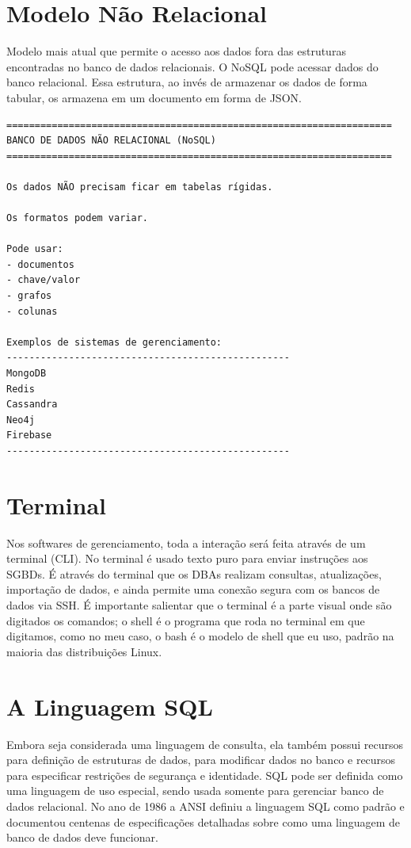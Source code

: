 \documentclass[12pt,a4paper]{article}
\begin{document}
\section*{Modelo Não Relacional}

Modelo mais atual que permite o acesso aos dados fora das estruturas encontradas no banco de dados relacionais. O NoSQL pode acessar dados do banco relacional. Essa estrutura, ao invés de armazenar os dados de forma tabular, os armazena em um documento em forma de JSON.

\begin{verbatim}
====================================================================
BANCO DE DADOS NÃO RELACIONAL (NoSQL)
====================================================================

Os dados NÃO precisam ficar em tabelas rígidas.

Os formatos podem variar.

Pode usar:
- documentos
- chave/valor
- grafos
- colunas

Exemplos de sistemas de gerenciamento:
--------------------------------------------------
MongoDB
Redis
Cassandra
Neo4j
Firebase
--------------------------------------------------
\end{verbatim}

\section*{Terminal}

Nos softwares de gerenciamento, toda a interação será feita através de um terminal (CLI). No terminal é usado texto puro para enviar instruções aos SGBDs. É através do terminal que os DBAs realizam consultas, atualizações, importação de dados, e ainda permite uma conexão segura com os bancos de dados via SSH. É importante salientar que o terminal é a parte visual onde são digitados os comandos; o shell é o programa que roda no terminal em que digitamos, como no meu caso, o bash é o modelo de shell que eu uso, padrão na maioria das distribuições Linux.

\section*{A Linguagem SQL}

Embora seja considerada uma linguagem de consulta, ela também possui recursos para definição de estruturas de dados, para modificar dados no banco e recursos para especificar restrições de segurança e identidade. SQL pode ser definida como uma linguagem de uso especial, sendo usada somente para gerenciar banco de dados relacional. No ano de 1986 a ANSI definiu a linguagem SQL como padrão e documentou centenas de especificações detalhadas sobre como uma linguagem de banco de dados deve funcionar.
\end{document}
